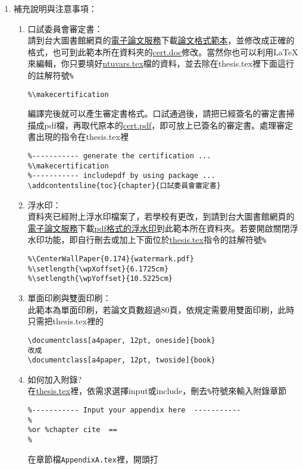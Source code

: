 \begin{enumerate}[leftmargin=0pt, topsep=0pt, itemsep=0pt, label=\Roman{*}.]
\begin{enumerate}[topsep=0pt, itemsep=0pt, label=\arabic{*}.]
\end{enumerate} 
\item 補充說明與注意事項：
\begin{enumerate}[topsep=0pt, itemsep=0pt, label=$\bullet$]
    \item 口試委員會審定書：\\
    請到台大圖書館網頁的\href{http://etds.lib.ntu.edu.tw/etdsystem/submit/submitLogin}{電子論文服務}下載\href{http://gra103.aca.ntu.edu.tw/gra2007/gra/tienn/\%E5\%AD\%B8\%E4\%BD\%8D\%E8\%80\%83\%E8\%A9\%A6\%E8\%A1\%A8\%E5\%86\%8A/THESISSAMPLE.DOC}{論文格式範本}，並修改成正確的格式，也可到此範本所在資料夾的\href{run:./cert.doc}{cert.doc}修改。當然你也可以利用LaTeX來編輯，你只要填好\href{run:./ntuvars.tex}{ntuvars.tex}檔的資料，並去除在thesis.tex裡下面這行的註解符號\texttt{\%} 
    \begin{verbatim}
%\makecertification
    \end{verbatim}
    編譯完後就可以產生審定書格式。口試通過後，請把已經簽名的審定書掃描成pdf檔，再取代原本的\href{run:./cert.pdf}{cert.pdf}，即可放上已簽名的審定書。處理審定書出現的指令在thesis.tex裡 
    \begin{verbatim}
%----------- generate the certification ...
%\makecertification
%----------- includepdf by using package ...
\addcontentsline{toc}{chapter}{口試委員會審定書}

    \end{verbatim}
    \item 浮水印：\\
    資料夾已經附上浮水印檔案了，若學校有更改，到請到台大圖書館網頁的\href{http://etds.lib.ntu.edu.tw/etdsystem/submit/submitLogin}{電子論文服務}下載\href{http://etds.lib.ntu.edu.tw/files/watermark.pdf}{pdf格式的浮水印}到此範本所在資料夾。若要開啟關閉浮水印功能，即自行刪去或加上下面位於\href{run:./thesis.tex}{thesis.tex}指令的註解符號\texttt{\%}
    \begin{verbatim}
%\CenterWallPaper{0.174}{watermark.pdf}
%\setlength{\wpXoffset}{6.1725cm}
%\setlength{\wpYoffset}{10.5225cm}
    \end{verbatim}
    \item 單面印刷與雙面印刷：\\
    此範本為單面印刷，若論文頁數超過80頁，依規定需要用雙面印刷，此時只需把thesis.tex裡的
    \begin{verbatim}
\documentclass[a4paper, 12pt, oneside]{book}
改成
\documentclass[a4paper, 12pt, twoside]{book}
    \end{verbatim}
        \item 如何加入附錄?\\
    在\href{run:./thesis.tex}{thesis.tex}裡，依需求選擇input或include，刪去\texttt{\%}符號來輸入附錄章節
    \begin{verbatim}
%----------- Input your appendix here  -----------
%
%or %chapter cite  == 
%
    \end{verbatim}
    在章節檔\texttt{AppendixA.tex}裡，開頭打
    \begin{verbatim}

\end{verbatim}
\end{enumerate}
\end{enumerate}
